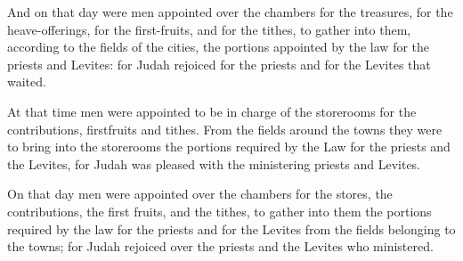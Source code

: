 			\begin{versebox}
					\item[BHS] 
					\item[LXX] 
					\item[ASV] And on that day were men appointed over the chambers for the treasures, for the heave-offerings, for the first-fruits, and for the tithes, to gather into them, according to the fields of the cities, the portions appointed by the law for the priests and Levites: for Judah rejoiced for the priests and for the Levites that waited.
					\item[NIV] At that time men were appointed to be in charge of the storerooms for the contributions, firstfruits and tithes. From the fields around the towns they were to bring into the storerooms the portions required by the Law for the priests and the Levites, for Judah was pleased with the ministering priests and Levites.
					\item[NRSV] On that day men were appointed over the chambers for the stores, the contributions, the first fruits, and the tithes, to gather into them the portions required by the law for the priests and for the Levites from the fields belonging to the towns; for Judah rejoiced over the priests and the Levites who ministered.
			\end{versebox}

